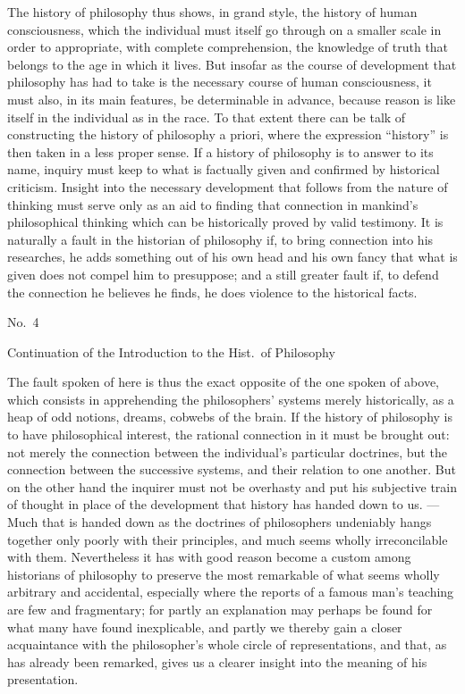 \documentclass[12pt]{article}
\newcommand{\opage}[1]{\marginnote{\footnotesize\textit{[#1]}}}
\begin{document}
The history of philosophy thus shows, in grand style, the history of human consciousness, which the individual must itself go through on a smaller scale in order to appropriate, with complete comprehension, the knowledge of truth that belongs to the age in which it lives. %
 But insofar as the course of development that philosophy has had to take is the necessary course of human consciousness, it must also, in its main features, be determinable in advance, because reason is like itself in the individual as in the race. To that extent there can be talk of constructing the history of philosophy a priori, where the expression ``history'' is then taken in a less proper sense. If a history of philosophy is to answer to its name, inquiry must keep to what is factually given and confirmed by historical criticism. Insight into the necessary development that follows from the nature of thinking must serve only as an aid to finding that connection in mankind's philosophical thinking which can be historically proved by valid testimony. It is naturally a fault in the historian of philosophy if, to bring connection into his researches, he adds something out of his own head and his own fancy that what is given does not compel him to presuppose; and a still greater fault if, to defend the connection he believes he finds, he does violence to the historical facts.

\begin{flushright}\opage{7r}No.\ 4\end{flushright}

\begin{center}Continuation of the Introduction to the Hist.\ of Philosophy\end{center}

\noindent The fault spoken of here is thus the exact opposite of the one spoken of above, which consists in apprehending the philosophers' systems merely historically, as a heap of odd notions, dreams, cobwebs of the brain. If the history of philosophy is to have philosophical interest, the rational connection in it must be brought out: not merely the connection between the individual's particular doctrines, but the connection between the successive systems, and their relation to one another. But on the other hand the inquirer must not be overhasty and put his subjective train of thought in place of the development that history has handed down to us. --- Much that is handed down as the doctrines of philosophers undeniably hangs together only poorly with their principles, and much seems wholly irreconcilable with them. Nevertheless it has with good reason become a custom among historians of philosophy to preserve the most remarkable of what seems wholly arbitrary and accidental, %
especially where the reports of a famous man's teaching are few and fragmentary; for partly an explanation may perhaps be found for what many have found inexplicable, and partly we thereby gain a closer acquaintance with the philosopher's whole circle of representations, and that, as has already been remarked, gives us a clearer insight into the meaning of his presentation.
\end{document}
